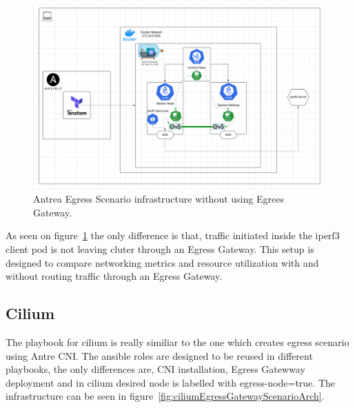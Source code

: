 \begin{figure}[tbh]
  \centering
  \includegraphics[width=1\columnwidth]{images/antrea_egress_no_gateway.png}
  \caption{Antrea Egress Scenario infrastructure without using Egrees Gateway.}
  \label{fig:antreaEgressNoGatewayScenarioArch}
\end{figure}

As seen on figure~\ref{fig:antreaEgressNoGatewayScenarioArch} the only difference is that, traffic initiated inside the iperf3 client pod is not leaving cluter through an Egress Gateway. This setup is designed to compare networking metrics and resource utilization with and without routing traffic through an Egress Gateway.


\subsection{Cilium}
\label{sec:ciliumEgress}

The playbook for cilium is really similiar to the one which creates egress scenario using Antre CNI. The ansible roles are designed to be reused in different playbooks, the only differences are, CNI installation, Egress Gatewway deployment and in cilium desired node is labelled with egress-node=true. The infrastructure can be seen in figure~\ref{fig:ciliumEgressGatewayScenarioArch}.

